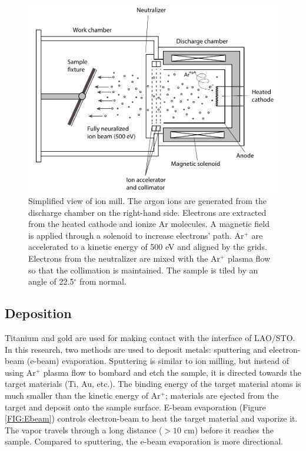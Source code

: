 \documentclass[pdflatex, sectionletters, 12pt]{pittetd}    %
\begin{document}
\begin{figure}[hp]
	\centering
	\includegraphics[width=1.0\textwidth]{Drawing/IonMill.pdf}
	\caption{Simplified view of ion mill. The argon ions are generated from the discharge chamber on the right-hand side. Electrons are extracted from the heated cathode and ionize Ar molecules. A magnetic field is applied through a solenoid to increase electrons' path. Ar$^{+}$ are accelerated to a kinetic energy of 500 eV and aligned by the grids. Electrons from the neutralizer are mixed with the Ar$^{+}$ plasma flow so that the collimation is maintained. The sample is tiled by an angle of 22.5$^{\circ}$ from normal.}
	\label{FIG:IonMill}
\end{figure}

\subsection{Deposition}

Titanium and gold are used for making contact with the interface of LAO/STO. In this research, two methods are used to deposit metals: sputtering and electron-beam (e-beam) evaporation. Sputtering is similar to ion milling, but instead of using Ar$^{+}$ plasma flow to bombard and etch the sample, it is directed towards the target materials (Ti, Au, etc.). The binding energy of the target material atoms is much smaller than the kinetic energy of Ar$^{+}$; materials are ejected from the target and deposit onto the sample surface. E-beam evaporation (Figure \ref{FIG:Ebeam}) controls electron-beam to heat the target material and vaporize it. The vapor travels through a long distance ($> 10$ cm) before it reaches the sample. Compared to sputtering, the e-beam evaporation is more directional.
\end{document}
